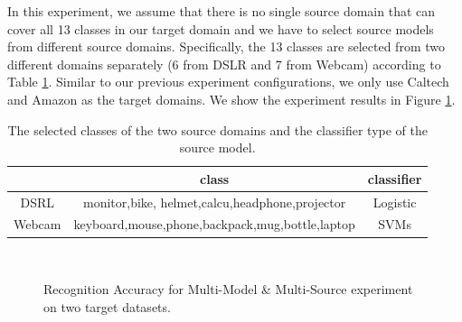 In this experiment, we assume that there is no single source domain that can cover all 13 classes in our target domain and we have to select source models from different source domains. Specifically, the 13 classes are selected from two different domains separately (6 from DSLR and 7 from Webcam) according to Table \ref{tab:class_gen}. Similar to our previous experiment configurations, we only use Caltech and Amazon as the target domains. We show the experiment results in Figure \ref{fig:exp2}.
\begin{table}[htbp]
	\centering
	\caption{The selected classes of the two source domains and the classifier type of the source model.}
	\begin{tabular}{|c|c|c|}
		\hline
		& class & classifier\\
		\hline
		DSRL& monitor,bike, helmet,calcu,headphone,projector & Logistic\\\hline
		Webcam&keyboard,mouse,phone,backpack,mug,bottle,laptop&SVMs\\ \hline
		
	\end{tabular}%
	\label{tab:class_gen}%
\end{table}%
\begin{figure}[h]
	\centering
	\\
	\caption{Recognition Accuracy for Multi-Model \& Multi-Source experiment on two target datasets. }
	\label{fig:exp2}
\end{figure}

